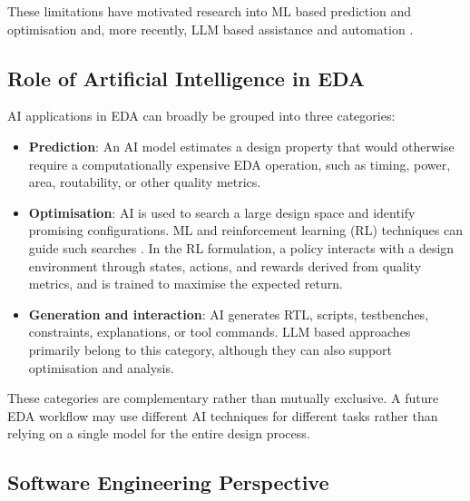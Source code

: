 \documentclass[conference]{IEEEtran}
\begin{document}
\noindent These limitations have motivated research into ML based prediction and optimisation and, more recently, LLM based assistance and automation \cite{P1_Huang2021,P2_Chen2023,P6_Pan2025}.

\subsection{Role of Artificial Intelligence in EDA} \label{B3}

\noindent AI applications in EDA can broadly be grouped into three categories: 
\begin{itemize}
    \item \textbf{Prediction}: An AI model estimates a design property that would otherwise require a computationally expensive EDA operation, such as timing, power, area, routability, or other quality metrics. \\

    \item \textbf{Optimisation}: AI is used to search a large design space and identify promising configurations. ML and reinforcement learning (RL) techniques can guide such searches \cite{P1_Huang2021,P2_Chen2023}. In the RL formulation, a policy interacts with a design environment through states, actions, and rewards derived from quality metrics, and is trained to maximise the expected return.\\
    
    \item \textbf{Generation and interaction}: AI generates RTL, scripts, testbenches, constraints, explanations, or tool commands. LLM based approaches primarily belong to this category, although they can also support optimisation and analysis.\\
\end{itemize}

\noindent These categories are complementary rather than mutually exclusive. A future EDA workflow may use different AI techniques for different tasks rather than relying on a single model for the entire design process.

\subsection{Software Engineering Perspective} \label{B4}
\end{document}
